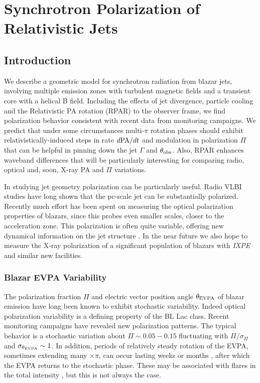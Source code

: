\chapter{Synchrotron Polarization of Relativistic Jets}
\label{chap:synch}

\section{Introduction}
We describe a geometric model for synchrotron radiation from blazar jets, involving multiple emission zones with turbulent magnetic fields and a transient core with a helical B field. Including the effects of jet divergence, particle cooling and the Relativistic PA rotation (RPAR) to the observer frame, we find polarization behavior consistent with recent data from monitoring campaigns. We predict that under some circumstances multi-$\pi$ rotation phases should exhibit relativistically-induced steps in rate $d{\rm PA}/dt$ and modulation in polarization $\Pi$ that can be helpful in pinning down the jet $\Gamma$ and $\theta_{\rm obs}$. Also, RPAR enhances waveband differences that will be particularly interesting for comparing radio, optical and, soon, X-ray PA and $\Pi$ variations.


In studying jet geometry polarization can be particularly useful. Radio VLBI studies have long shown that the pc-scale jet can be substantially polarized. Recently much effort has been spent on measuring the optical polarization properties of blazars, since this probes even smaller scales, closer to the acceleration zone. This polarization is often quite variable, offering new dynamical information on the jet structure \citep[e.g.][]{blinov_robopol:_2015, lynch_green_2018}.
In the near future we also hope to measure the X-ray polarization of a significant population of blazars with {\it IXPE} \citep{weisskopf_imaging_2016} and similar new facilities. 
\subsection{Blazar EVPA Variability}

The polarization fraction $\Pi$ and electric vector position angle $\theta_{\rm EVPA}$ of blazar emission have long been known to exhibit stochastic variability. Indeed optical polarization variability is a defining property of the BL Lac class. Recent monitoring campaigns have revealed new polarization patterns. The typical behavior is a stochastic variation about $\Pi\sim 0.05-0.15$ fluctuating with $\Pi/\sigma_\Pi$ and $\sigma_{\theta_{\rm EVPA}} \sim 1$. In addition, periods of relatively steady rotation of the EVPA, sometimes extending many $\times \pi$, can occur lasting weeks or months \citep{blinov_robopol:_2015}, after which the EVPA returns to the stochastic phase. These may be associated with flares in the total intensity \citep{blinov_robopol:_2016}, but this is not always the case.

